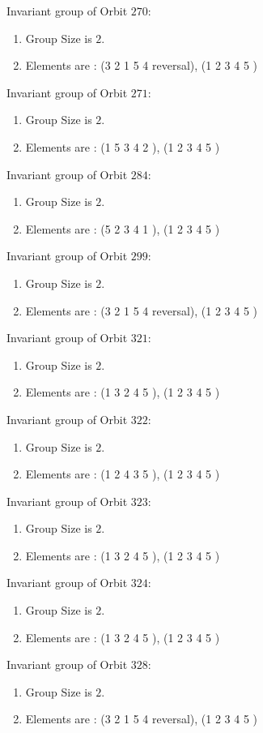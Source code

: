 \documentclass[12pt]{article}
\begin{document}
Invariant group of Orbit $270$:
\begin{enumerate}
\item Group Size is $2$.
\item Elements are : (3 2 1 5 4   reversal), (1 2 3 4 5  )
\end{enumerate}
Invariant group of Orbit $271$:
\begin{enumerate}
\item Group Size is $2$.
\item Elements are : (1 5 3 4 2  ), (1 2 3 4 5  )
\end{enumerate}
Invariant group of Orbit $284$:
\begin{enumerate}
\item Group Size is $2$.
\item Elements are : (5 2 3 4 1  ), (1 2 3 4 5  )
\end{enumerate}
Invariant group of Orbit $299$:
\begin{enumerate}
\item Group Size is $2$.
\item Elements are : (3 2 1 5 4   reversal), (1 2 3 4 5  )
\end{enumerate}
Invariant group of Orbit $321$:
\begin{enumerate}
\item Group Size is $2$.
\item Elements are : (1 3 2 4 5  ), (1 2 3 4 5  )
\end{enumerate}
Invariant group of Orbit $322$:
\begin{enumerate}
\item Group Size is $2$.
\item Elements are : (1 2 4 3 5  ), (1 2 3 4 5  )
\end{enumerate}
Invariant group of Orbit $323$:
\begin{enumerate}
\item Group Size is $2$.
\item Elements are : (1 3 2 4 5  ), (1 2 3 4 5  )
\end{enumerate}
Invariant group of Orbit $324$:
\begin{enumerate}
\item Group Size is $2$.
\item Elements are : (1 3 2 4 5  ), (1 2 3 4 5  )
\end{enumerate}
Invariant group of Orbit $328$:
\begin{enumerate}
\item Group Size is $2$.
\item Elements are : (3 2 1 5 4   reversal), (1 2 3 4 5  )
\end{enumerate}
\end{document}
